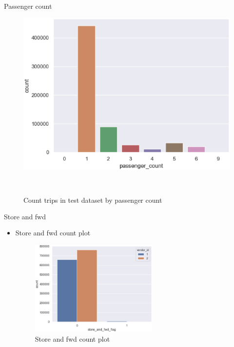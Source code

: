 \documentclass[
 size=12pt,
 paper=smartboard, %
 mode=present, %
 display=slides, %
style=tuliplab,
pauseslide,
fleqn,leqno]{powerdot}
\begin{document}
\begin{slide}{Passenger count}
\begin{itemize}
\begin{figure}[h]
\begin{minipage}[t]{0.4\linewidth}
        \includegraphics[width=1.0\textwidth]{figures2/passenger_count_test.eps}
        \caption{Count trips in test dataset by passenger count}
        \label{fig:count-by-passenger-count-test}
      \end{minipage} 
    \end{figure}
  \end{itemize}
\end{slide}


\begin{slide}{Store and fwd}
  \begin{itemize}
    \item Store and fwd count plot
    \begin{figure}[h]
      \centering
      \includegraphics[width=0.6\textwidth]{figures2/store_and_fwd_flag.eps}
      \caption{Store and fwd count plot}
      \label{fig:store-and-fwd}
    \end{figure}
  \end{itemize}
\end{slide}
\end{document}
